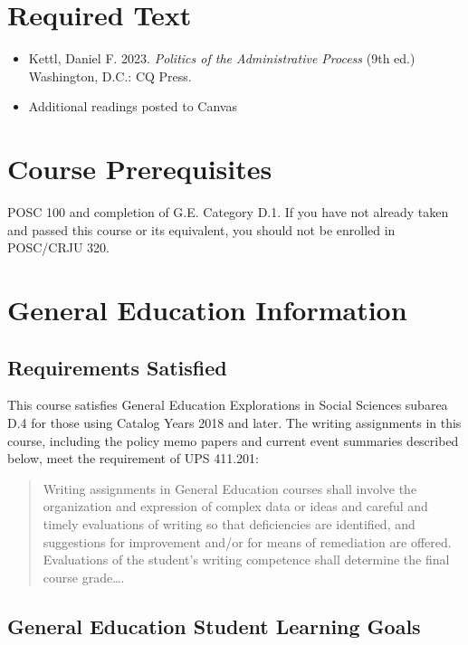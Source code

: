 \documentclass[11pt, letterpaper]{article}
\begin{document}
\section{Required Text}

\begin{itemize}
    \item Kettl, Daniel F. 2023. \emph{Politics of the Administrative Process} (9th ed.) Washington, D.C.: CQ Press.
    \item Additional readings posted to Canvas
\end{itemize}

\section{Course Prerequisites}

POSC 100 and completion of G.E. Category D.1.  If you have not already taken and passed this course or its equivalent, you should not be enrolled in POSC/CRJU 320.

\section{General Education Information}


\subsection*{Requirements Satisfied}

	This course satisfies General Education Explorations in Social Sciences subarea D.4 for those using Catalog Years 2018 and later. The writing assignments in this course, including the policy memo papers and current event summaries described below, meet the requirement of UPS 411.201: 
	\begin{quote}Writing assignments in General Education courses shall involve the organization and expression of complex data or ideas and careful and timely evaluations of writing so that deficiencies are identified, and suggestions for improvement and/or for means of remediation are offered. Evaluations of the student's writing competence shall determine the final course grade\ldots .\end{quote}

\subsection*{General Education Student Learning Goals}
\end{document}
